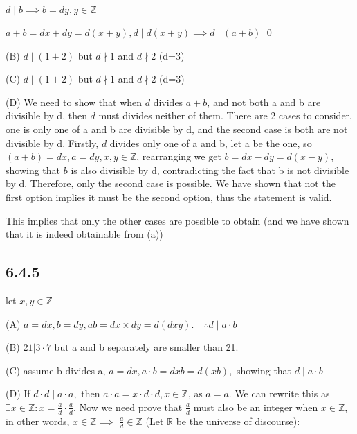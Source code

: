\documentclass{article}
\begin{document}
$d\mid b\implies b=dy,y\in\mathbb{Z}$

$a+b=dx+dy=d(x+y), d\mid d(x+y)\implies d\mid(a+b)$ \qed


(B) $d\mid(1+2)$ but $d\nmid 1$ and $d\nmid 2$ (d=3)

(C)  $d\mid(1+2)$ but $d\nmid 1$ and $d\nmid 2$ (d=3)

(D) We need to show that when $d$ divides $a+b$, and not both a and b are divisible by d, then $d$ must divides neither of them. There are 2 cases to consider, one is only one of a and b are divisible by d, and the second case is both are not divisible by d. Firstly, $d$ divides only one of a and b, let a be the one, so $(a+b)=dx, a=dy, x,y\in\mathbb{Z}$, rearranging we get $b=dx-dy=d(x-y),$ showing that $b$ is also divisible by d, contradicting the fact that b is not divisible by d. Therefore, only the second case is possible. We have shown that not the first option implies it must be the second option, thus the statement is valid. 

This implies that only the other cases are possible to obtain (and we have shown that it is indeed obtainable from (a))

\subsection*{6.4.5}

let $x,y\in\mathbb{Z}$

(A) $a=dx,b=dy,ab=dx\times dy=d(dxy).\quad\therefore d\mid a\cdot b$ 

(B) $21|3\cdot7$ but a and b separately are smaller than 21.

(C) assume b divides a, $a=dx, a\cdot b=dxb=d(xb),$ showing that $d\mid a\cdot b$  

(D) If $d\cdot d\mid a\cdot a,$ then $a\cdot a=x\cdot d\cdot d,x\in\mathbb{Z}$, as $a=a$. We can rewrite this as $\exists x\in\mathbb{Z}:x=\frac{a}{d}\cdot\frac{a}{d}$. Now we need prove that $\frac{a}{d}$ must also be an integer when $x\in\mathbb{Z}$, in other words, $x\in\mathbb{Z}\implies$  $\frac{a}{d}\in\mathbb{Z}$ (Let $\mathbb{R}$ be the universe of discourse): 
\end{document}
